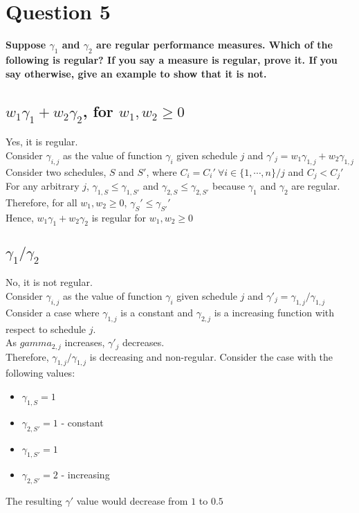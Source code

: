 \documentclass[a4paper, fleqn]{article}
\begin{document}
\section{Question 5}
\textbf{Suppose $\gamma_1$ and $\gamma_2$ are regular performance measures. Which of the following is regular? If you say a measure is regular, prove it. If you say otherwise, give an example to show that it is not.}

\subsection{$w_1\gamma_1 +w_2\gamma_2$, for $w_1,w_2\geq0$}
Yes, it is regular.\\
Consider $\gamma_{i,j}$ as the value of function $\gamma_i$ given schedule $j$ and $\gamma'_j=w_1\gamma_{1,j}+w_2\gamma_{1,j}$\\
Consider two schedules, $S$ and $S'$, where $C_i=C_i'\ \forall i\in\{1,\cdots,n\}/j$ and $C_j< C_j'$\\
For any arbitrary $j$, $\gamma_{1,S}\leq\gamma_{1,S'}$ and $\gamma_{2,S}\leq\gamma_{2,S'}$  because $\gamma_1$ and $\gamma_2$ are regular.\\
Therefore, for all $w_1, w_2\geq0$, $\gamma_S'\leq\gamma_{S'}'$\\
Hence, $w_1\gamma_1+ w_2\gamma_2$ is regular for $w_1,w_2\geq0$

\subsection{$\gamma_1/\gamma_2$}
No, it is not regular.\\
Consider $\gamma_{i,j}$ as the value of function $\gamma_i$ given schedule $j$ and $\gamma'_j=\gamma_{1,j}/\gamma_{1,j}$\\ 
Consider a case where $\gamma_{1,j}$ is a constant and $\gamma_{2,j}$ is a increasing function with respect to schedule $j$.\\
As $gamma_{2,j}$ increases, $\gamma'_j$ decreases.\\
Therefore, $\gamma_{1,j}/\gamma_{1,j}$ is decreasing and non-regular.
Consider the case with the following values: \begin{itemize}
\item $\gamma_{1,S}=1$
\item $\gamma_{2,S'}=1$ - constant
\item $\gamma_{1,S'}=1$
\item $\gamma_{2,S'}=2$ - increasing
\end{itemize}
The resulting $\gamma'$ value would decrease from $1$ to $0.5$
\end{document}
